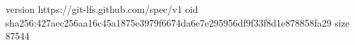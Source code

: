 version https://git-lfs.github.com/spec/v1
oid sha256:427aec256aa16c45a1875e3979f6674da6e7e295956df9f33f8d1e878858fa29
size 87544
